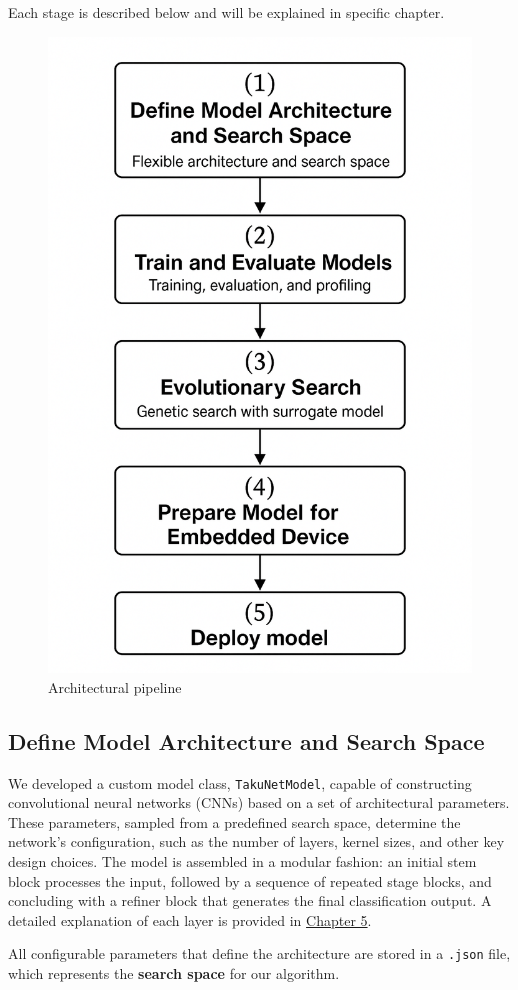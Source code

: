 Each stage is described below and will be explained in specific chapter.

\begin{figure}[H]
    \centering
    \includegraphics[width=0.6\linewidth]{Pictures/Architecture.png}
    \caption{Architectural pipeline}
    \label{fig:architectural_pipeline}
\end{figure}





\subsection{Define Model Architecture and Search Space}

We developed a custom model class, \texttt{TakuNetModel}, capable of constructing convolutional neural networks (CNNs) based on a set of architectural parameters. These parameters, sampled from a predefined search space, determine the network's configuration, such as the number of layers, kernel sizes, and other key design choices. The model is assembled in a modular fashion: an initial stem block processes the input, followed by a sequence of repeated stage blocks, and concluding with a refiner block that generates the final classification output. A detailed explanation of each layer is provided in \hyperref[chap:Architecture]{Chapter 5}.

All configurable parameters that define the architecture are stored in a \texttt{.json} file, which represents the \textbf{search space} for our algorithm.




